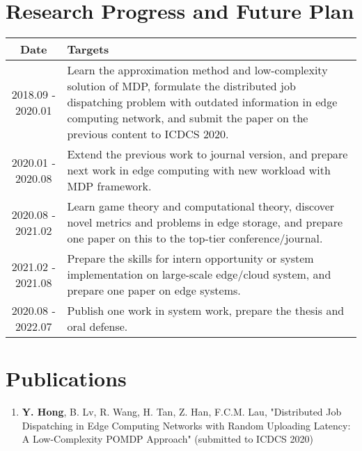 \section{Research Progress and Future Plan}

\begin{center}
    \begin{tabularx}{0.90\linewidth}{ |c|X| }
        \hline  \textbf{Date}      & \textbf{Targets} \\
        \hline  {2018.09 - 2020.01}  & 
                {Learn the approximation method and low-complexity solution of MDP, formulate the distributed job dispatching problem with outdated information in edge computing network, and submit the paper on the previous content to ICDCS 2020.} \\
        \hline  {2020.01 - 2020.08}  & 
                {Extend the previous work to journal version, and prepare next work in edge computing with new workload with MDP framework.} \\
        \hline  {2020.08 - 2021.02}  & 
                {Learn game theory and computational theory, discover novel metrics and problems in edge storage, and prepare one paper on this to the top-tier conference/journal.} \\
        \hline  {2021.02 - 2021.08}  & 
                {Prepare the skills for intern opportunity or system implementation on large-scale edge/cloud system, and prepare one paper on edge systems.} \\
        \hline  {2020.08 - 2022.07}  & 
                {Publish one work in system work, prepare the thesis and oral defense.} \\
        \hline
    \end{tabularx}
\end{center}

\section{Publications}
\begin{enumerate}
    \item \textbf{Y. Hong}, {B. Lv}, {R. Wang}, {H. Tan}, {Z. Han}, {F.C.M. Lau}, "Distributed Job Dispatching in Edge Computing Networks with Random Uploading Latency: A Low-Complexity POMDP Approach" (submitted to ICDCS 2020)
\end{enumerate}